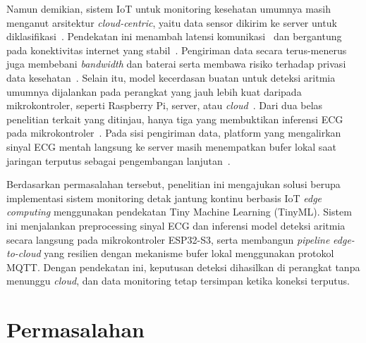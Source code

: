 Namun demikian, sistem IoT untuk monitoring kesehatan umumnya masih menganut arsitektur \textit{cloud-centric}, yaitu data sensor dikirim ke server untuk diklasifikasi~\cite{kim_2023, al_quayed_2026}. Pendekatan ini menambah latensi komunikasi~\cite{al_quayed_2026} dan bergantung pada konektivitas internet yang stabil~\cite{kim_2023, yaacoub_2020}. Pengiriman data secara terus-menerus juga membebani \textit{bandwidth} dan baterai serta membawa risiko terhadap privasi data kesehatan~\cite{al_quayed_2026, kim_2023}. Selain itu, model kecerdasan buatan untuk deteksi aritmia umumnya dijalankan pada perangkat yang jauh lebih kuat daripada mikrokontroler, seperti Raspberry Pi, server, atau \textit{cloud}~\cite{karri_2023, xie_2021, mulyawan_2026}. Dari dua belas penelitian terkait yang ditinjau, hanya tiga yang membuktikan inferensi ECG pada mikrokontroler~\cite{kim_2023, zambrano_2026, sheeba_rani_2026}. Pada sisi pengiriman data, platform yang mengalirkan sinyal ECG mentah langsung ke server masih menempatkan bufer lokal saat jaringan terputus sebagai pengembangan lanjutan~\cite{escobedo_2026}.

Berdasarkan permasalahan tersebut, penelitian ini mengajukan solusi berupa implementasi sistem monitoring detak jantung kontinu berbasis IoT \textit{edge computing} menggunakan pendekatan Tiny Machine Learning (TinyML). Sistem ini menjalankan preprocessing sinyal ECG dan inferensi model deteksi aritmia secara langsung pada mikrokontroler ESP32-S3, serta membangun \textit{pipeline} \textit{edge-to-cloud} yang resilien dengan mekanisme bufer lokal menggunakan protokol MQTT. Dengan pendekatan ini, keputusan deteksi dihasilkan di perangkat tanpa menunggu \textit{cloud}, dan data monitoring tetap tersimpan ketika koneksi terputus.

\section{Permasalahan}

